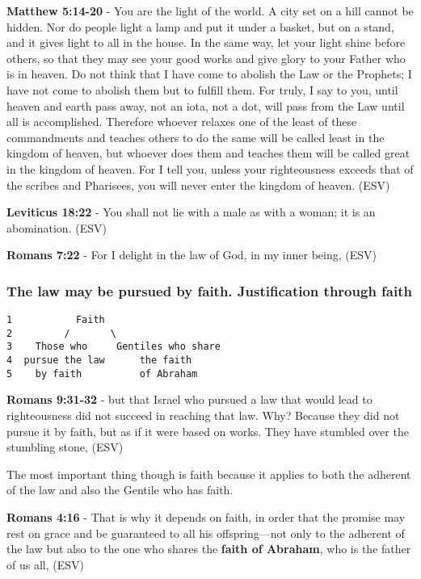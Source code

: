 \documentclass[11pt]{article}
\begin{document}
\textbf{Matthew 5:14-20} - You are the light of the world. A city set on a hill cannot be hidden. Nor do people light a lamp and put it under a basket, but on a stand, and it gives light to all in the house. In the same way, let your light shine before others, so that they may see your good works and give glory to your Father who is in heaven. Do not think that I have come to abolish the Law or the Prophets; I have not come to abolish them but to fulfill them. For truly, I say to you, until heaven and earth pass away, not an iota, not a dot, will pass from the Law until all is accomplished. Therefore whoever relaxes one of the least of these commandments and teaches others to do the same will be called least in the kingdom of heaven, but whoever does them and teaches them will be called great in the kingdom of heaven. For I tell you, unless your righteousness exceeds that of the scribes and Pharisees, you will never enter the kingdom of heaven. (ESV)

\textbf{Leviticus 18:22} - You shall not lie with a male as with a woman; it is an abomination. (ESV)

\textbf{Romans 7:22} - For I delight in the law of God, in my inner being, (ESV)

\subsubsection{The law may be pursued by faith. Justification through faith}
\label{sec:org93719f9}

\begin{verbatim}
1           Faith
2         /       \
3    Those who     Gentiles who share
4  pursue the law      the faith
5    by faith          of Abraham
\end{verbatim}

\textbf{Romans 9:31-32} - but that Israel who pursued a law that would lead to righteousness did not succeed in reaching that law. Why? Because they did not pursue it by faith, but as if it were based on works. They have stumbled over the stumbling stone, (ESV)

The most important thing though is faith because it applies to both the adherent of the law and also the Gentile who has faith.

\textbf{Romans 4:16} - That is why it depends on faith, in order that the promise may rest on grace and be guaranteed to all his offspring—not only to the adherent of the law but also to the one who shares the \textbf{faith of Abraham}, who is the father of us all, (ESV)
\end{document}
